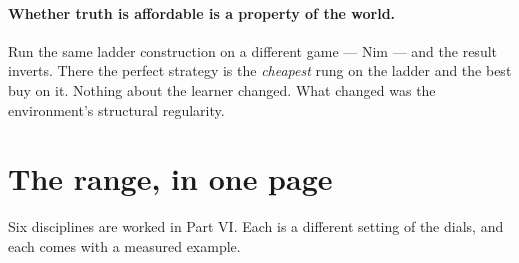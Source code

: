 \paragraph{Whether truth is affordable is a property of the world.} Run the same
ladder construction on a different game --- Nim \cite{ComposeNote} --- and the
result inverts. There the perfect strategy is the \emph{cheapest} rung on the
ladder and the best buy on it. Nothing about the learner changed. What changed was
the environment's structural regularity.

\section{The range, in one page}
\label{sec:0range}

Six disciplines are worked in Part VI. Each is a different setting of the dials,
and each comes with a measured example.


